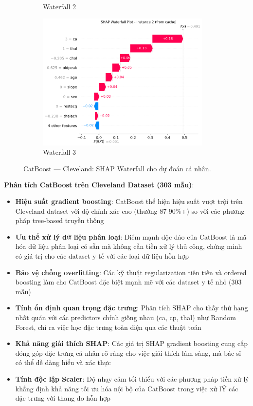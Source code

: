 \begin{figure}[H]
\begin{subfigure}[b]{0.31\textwidth}
\caption{Waterfall 2}
\label{fig:cat_clev_waterfall2}
\end{subfigure}\hfill
\begin{subfigure}[b]{0.31\textwidth}
\centering
\includegraphics[width=0.95\textwidth]{Result/cleveland_dataset/Catboost/SHAP/Waterfall 3.png}
\caption{Waterfall 3}
\label{fig:cat_clev_waterfall3}
\end{subfigure}
\caption{CatBoost — Cleveland: SHAP Waterfall cho dự đoán cá nhân.}
\label{fig:cat_clev_waterfalls}
\end{figure}

\textbf{Phân tích CatBoost trên Cleveland Dataset (303 mẫu)}:
\begin{itemize}[leftmargin=*]
    \item \textbf{Hiệu suất gradient boosting}: CatBoost thể hiện hiệu suất vượt trội trên Cleveland dataset với độ chính xác cao (thường 87-90\%+) so với các phương pháp tree-based truyền thống
    \item \textbf{Ưu thế xử lý dữ liệu phân loại}: Điểm mạnh độc đáo của CatBoost là mã hóa dữ liệu phân loại có sẵn mà không cần tiền xử lý thủ công, chứng minh có giá trị cho các dataset y tế với các loại dữ liệu hỗn hợp
    \item \textbf{Bảo vệ chống overfitting}: Các kỹ thuật regularization tiên tiến và ordered boosting làm cho CatBoost đặc biệt mạnh mẽ với các dataset y tế nhỏ (303 mẫu)
    \item \textbf{Tính ổn định quan trọng đặc trưng}: Phân tích SHAP cho thấy thứ hạng nhất quán với các predictors chính giống nhau (ca, cp, thal) như Random Forest, chỉ ra việc học đặc trưng toàn diện qua các thuật toán
    \item \textbf{Khả năng giải thích SHAP}: Các giá trị SHAP gradient boosting cung cấp đóng góp đặc trưng cá nhân rõ ràng cho việc giải thích lâm sàng, mà bác sĩ có thể dễ dàng hiểu và xác thực
    \item \textbf{Tính độc lập Scaler}: Độ nhạy cảm tối thiểu với các phương pháp tiền xử lý khẳng định khả năng tối ưu hóa nội bộ của CatBoost trong việc xử lÝ các đặc trưng với thang đo hỗn hợp
\end{itemize}

